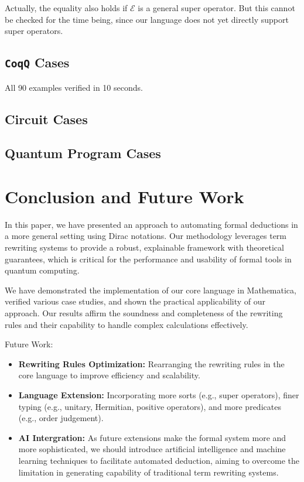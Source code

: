 \documentclass[manuscript, review, timestamp]{acmart}
\begin{document}
Actually, the equality also holds if $\mathcal{E}$ is a general super operator. But this cannot be checked for the time being, since our language does not yet directly support super operators.

\subsection{\texttt{CoqQ} Cases}

All 90 examples verified in 10 seconds.

\subsection{Circuit Cases}

\subsection{Quantum Program Cases}

\section{Conclusion and Future Work}

In this paper, we have presented an approach to automating formal deductions in a more general setting using Dirac notations. Our methodology leverages term rewriting systems to provide a robust, explainable framework with theoretical guarantees, which is critical for the performance and usability of formal tools in quantum computing.

We have demonstrated the implementation of our core language in Mathematica, verified various case studies, and shown the practical applicability of our approach. Our results affirm the soundness and completeness of the rewriting rules and their capability to handle complex calculations effectively.


Future Work:
\begin{itemize}
  \item \textbf{Rewriting Rules Optimization:} 
  Rearranging the rewriting rules in the core language to improve efficiency and scalability.
  \item \textbf{Language Extension:} 
  Incorporating more sorts (e.g., super operators), finer typing (e.g., unitary, Hermitian, positive operators), and more predicates (e.g., order judgement).
  \item \textbf{AI Intergration:} As future extensions make the formal system more and more sophisticated, we should introduce artificial intelligence and machine learning techniques to facilitate automated deduction, aiming to overcome the limitation in generating capability of traditional term rewriting systems.
\end{itemize}
\end{document}
